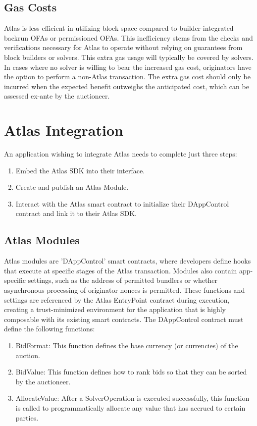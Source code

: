 \documentclass{article}
\begin{document}
\subsection{Gas Costs}
Atlas is less efficient in utilizing block space compared to builder-integrated backrun OFAs or permissioned OFAs. This inefficiency stems from the checks and verifications necessary for Atlas to operate without relying on guarantees from block builders or solvers. This extra gas usage will typically be covered by solvers.  In cases where no solver is willing to bear the increased gas cost, originators have the option to perform a non-Atlas transaction. The extra gas cost should only be incurred when the expected benefit outweighs the anticipated cost, which can be assessed ex-ante by the auctioneer.

\section{Atlas Integration}
An application wishing to integrate Atlas needs to complete just three steps:
\begin{enumerate}
\item Embed the Atlas SDK into their interface.
\item Create and publish an Atlas Module.
\item Interact with the Atlas smart contract to initialize their DAppControl contract and link it to their Atlas SDK.
\end{enumerate}

\subsection{Atlas Modules}
Atlas modules are 'DAppControl' smart contracts, where developers define hooks that execute at specific stages of the Atlas transaction. Modules also contain app-specific settings, such as the address of permitted bundlers or whether asynchronous processing of originator nonces is permitted. These functions and settings are referenced by the Atlas EntryPoint contract during execution, creating a trust-minimized environment for the application that is highly composable with its existing smart contracts.
The DAppControl contract must define the following functions:
\begin{enumerate}
\item BidFormat: This function defines the base currency (or currencies) of the auction.
\item BidValue: This function defines how to rank bids so that they can be sorted by the auctioneer.
\item AllocateValue: After a SolverOperation is executed successfully, this function is called to programmatically allocate any value that has accrued to certain parties.
\end{enumerate}
\end{document}

